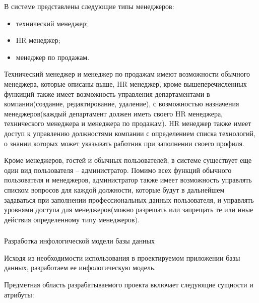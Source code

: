 В системе представлены следующие типы менеджеров:

\begin{itemize}
	\item технический менеджер;
	\item HR менеджер;
	\item менеджер по продажам.
\end{itemize}

Технический менеджер и менеджер по продажам имеют возможности обычного менеджера, которые описаны выше, HR менеджер,
кроме вышеперечисленных функиций также имеет возможность управления департаментами в компании(создание, редактирование,
удаление), с возможностью назначения менеджеров(каждый департамент должен иметь своего HR менеджера, технического
менеджера и менеджера по продажам). HR менеджер также имеет доступ к управлению должностями компании с определением
списка технологий, о знании которых может указывать работник при заполнении своего профиля.

Кроме менеджеров, гостей и обычных пользователей, в системе существует еще один вид пользователя -- администратор. 
Помимо всех функций обычного пользователя и менеджеров, администратор также имеет возможность управлять списком
вопросов для каждой должности, которые будут в дальнейшем задаваться при заполнении профессиональных данных пользователя,
и управлять уровнями доступа для менеджеров(можно разрешать или запрещать те или иные действия определенному типу
менеджеров).

\subsubsection{} Разработка инфологической модели базы данных
\label{sec:domain:model:db}

Исходя из необходимости использования в проектируемом приложении базы данных, разработаем ее инфологическую модель.

Предметная область разрабатываемого проекта включает следующие сущности и атрибуты:

